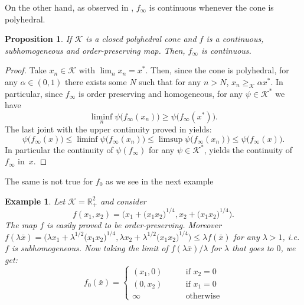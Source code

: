 \documentclass{article}
\newtheorem{example}[theorem]{Example}
\newtheorem{proposition}[theorem]{Proposition}
\newcommand{\R}{\mathbb{R}}
\newcommand{\cone}{\mathcal{K}}
\newcommand{\cgeq}{\geq_{\cone}}
\begin{document}
%
On the other hand, as observed in \cite{cavalcante2019connections}, $f_{\infty}$ is continuous whenever the cone is polyhedral.
%
\begin{proposition}
    If $\cone$ is a closed polyhedral cone and $f$ is a continuous, subhomogeneous and order-preserving map. Then, $f_{\infty}$ is continuous.
\end{proposition}
\begin{proof}
    Take $x_n\in \cone$ with $\lim_{n}x_n=x^*$. Then, since the cone is polyhedral, for any $\alpha\in(0,1)$ there exists some $N$ such that for any $n>N$, $x_n\cgeq \alpha x^*$. In particular, since $f_{\infty}$ is order preserving and homogeneous, for any $\psi\in \cone^
    *$ we have
    \begin{equation}
        \liminf_{n}\psi\big(f_{\infty}(x_n)\big)\geq\psi\big(f_{\infty}(x^*)\big).
    \end{equation}
    The last joint with the upper continuity proved in  yields:
\begin{equation}
    \psi\big(f_{\infty}(x)\big)\leq \liminf \psi\big(f_{\infty}(x_n)\big) \leq \limsup \psi\big(f_{\infty}(x_n)\big) \leq \psi\big(f_{\infty}(x)\big).
\end{equation}
In particular the continuity of $\psi(f_{\infty})$ for any $\psi\in\cone^*$, yields the continuity of $f_{\infty}$ in~$x$.
\end{proof}
%
%
The same is not true for $f_0$ as we see in the next example
%
\begin{example}
    Let $\cone=\R_+^2$ and consider
    \begin{equation}
        f(x_1,x_2)=\Big(x_1+\big(x_1x_2\big)^{1/4}, x_2+\big(x_1x_2\big)^{1/4}\Big).
    \end{equation}
   The map $f$ is easily proved to be order-preserving. Moreover $f(\lambda \bar{x})=\Big(\lambda x_1+\lambda^{1/2}\big(x_1x_2\big)^{1/4}, \lambda x_2+\lambda^{1/2}\big(x_1x_2\big)^{1/4}\Big)\leq \lambda f(\bar{x})$ for any $\lambda>1$, i.e. $f$ is subhomogeneous. Now taking the limit of $f(\lambda\bar{x})/\lambda$ for $\lambda$ that goes to $0$, we get:
   \begin{equation}
   f_0(\bar{x})=\begin{cases}
           (x_1,0) \qquad &\text{if } x_2=0\\
           (0,x_2) \qquad &\text{if } x_1=0\\
           \infty \qquad &\text{otherwise}
       \end{cases}
   \end{equation}
\end{example}
\end{document}

